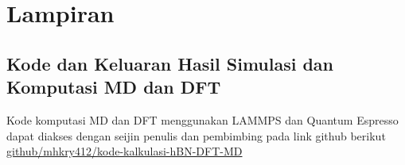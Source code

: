 % 

\chapter{Lampiran}



\section{Kode dan Keluaran Hasil Simulasi dan Komputasi MD dan DFT }
Kode komputasi MD dan DFT menggunakan LAMMPS dan Quantum Espresso dapat diakses dengan seijin penulis dan pembimbing pada link github berikut \href{https://github.com/mhkry412/Kode_Kalkulasi_hBN_DFT_MD}{github/mhkry412/kode-kalkulasi-hBN-DFT-MD}






